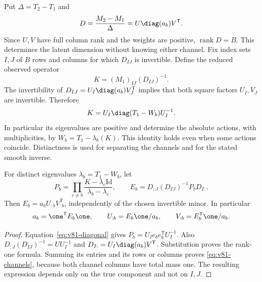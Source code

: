 Put $\Delta=T_2-T_1$ and
\begin{equation}\label{eq:v81-slope}
 D=\frac{M_2-M_1}{\Delta}=U\diag(a_b)V^{\mathsf T}.
\end{equation}
Since $U,V$ have full column rank and the weights are positive,
$\operatorname{rank}D=B$.  This determines the latent dimension without
knowing either channel.  Fix index sets $I,J$ of $B$ rows and columns
for which $D_{IJ}$ is invertible.  Define the reduced observed operator
\begin{equation}\label{eq:v81-K}
                     K=(M_1)_{IJ}(D_{IJ})^{-1}.
\end{equation}
The invertibility of $D_{IJ}=U_I\diag(a_b)V_J^{\mathsf T}$ implies
that both square factors $U_I,V_J$ are invertible.  Therefore
\begin{equation}\label{eq:v81-diagonal}
                K=U_I\diag(T_1-W_b)U_I^{-1}.
\end{equation}
In particular its eigenvalues are positive and determine the absolute
actions, with multiplicities, by $W_b=T_1-\lambda_b(K)$.
This identity holds even when some actions coincide.  Distinctness is
used for separating the channels and for the stated smooth inverse.

\begin{lemma}\label{lem:v81-components}
For distinct eigenvalues $\lambda_b=T_1-W_b$, let
\begin{equation}\label{eq:v81-projector}
 P_b=\prod_{c\ne b}\frac{K-\lambda_c\mathrm{Id}}{\lambda_b-\lambda_c},
 \qquad E_b=D_{:J}(D_{IJ})^{-1}P_bD_{I:}.
\end{equation}
Then $E_b=a_bU_{:b}V_{:b}^{\mathsf T}$, independently of the chosen
invertible minor.  In particular
\begin{equation}\label{eq:v81-channels}
 a_b=\one^{\mathsf T}E_b\one,\qquad
 U_{:b}=E_b\one/a_b,\qquad V_{:b}=E_b^{\mathsf T}\one/a_b.
\end{equation}
\end{lemma}
\begin{proof}
Equation~\eqref{eq:v81-diagonal} gives
$P_b=U_I e_be_b^{\mathsf T}U_I^{-1}$.  Also
$D_{:J}(D_{IJ})^{-1}=UU_I^{-1}$ and
$D_{I:}=U_I\diag(a_b)V^{\mathsf T}$.  Substitution proves the
rank-one formula.  Summing its entries and its rows or columns proves
\eqref{eq:v81-channels}, because both channel columns have total mass
one.  The resulting expression depends only on the true component and
not on $I,J$.
\end{proof}

